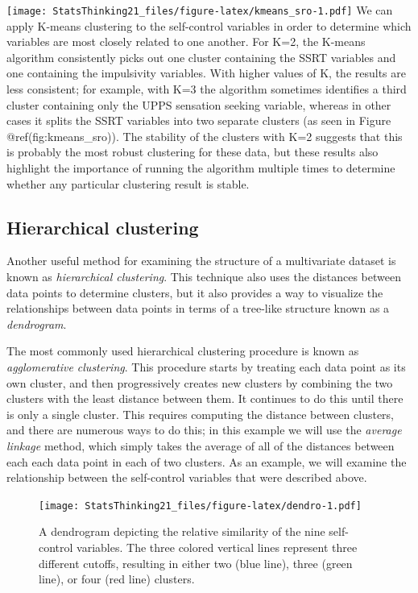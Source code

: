 \documentclass[
  12pt,
]{book}
\begin{document}
\texttt{[image: StatsThinking21\_files/figure-latex/kmeans\_sro-1.pdf]}
We can apply K-means clustering to the self-control variables in order to determine which variables are most closely related to one another. For K=2, the K-means algorithm consistently picks out one cluster containing the SSRT variables and one containing the impulsivity variables. With higher values of K, the results are less consistent; for example, with K=3 the algorithm sometimes identifies a third cluster containing only the UPPS sensation seeking variable, whereas in other cases it splits the SSRT variables into two separate clusters (as seen in Figure @ref(fig:kmeans\_sro)). The stability of the clusters with K=2 suggests that this is probably the most robust clustering for these data, but these results also highlight the importance of running the algorithm multiple times to determine whether any particular clustering result is stable.

\hypertarget{hierarchical-clustering}{%
\subsection{Hierarchical clustering}\label{hierarchical-clustering}}

Another useful method for examining the structure of a multivariate dataset is known as \emph{hierarchical clustering}. This technique also uses the distances between data points to determine clusters, but it also provides a way to visualize the relationships between data points in terms of a tree-like structure known as a \emph{dendrogram}.

The most commonly used hierarchical clustering procedure is known as \emph{agglomerative clustering}. This procedure starts by treating each data point as its own cluster, and then progressively creates new clusters by combining the two clusters with the least distance between them. It continues to do this until there is only a single cluster. This requires computing the distance between clusters, and there are numerous ways to do this; in this example we will use the \emph{average linkage} method, which simply takes the average of all of the distances between each each data point in each of two clusters. As an example, we will examine the relationship between the self-control variables that were described above.

\begin{figure}
\centering
\texttt{[image: StatsThinking21\_files/figure-latex/dendro-1.pdf]}
\caption{\label{fig:dendro}A dendrogram depicting the relative similarity of the nine self-control variables. The three colored vertical lines represent three different cutoffs, resulting in either two (blue line), three (green line), or four (red line) clusters.}
\end{figure}
\end{document}
